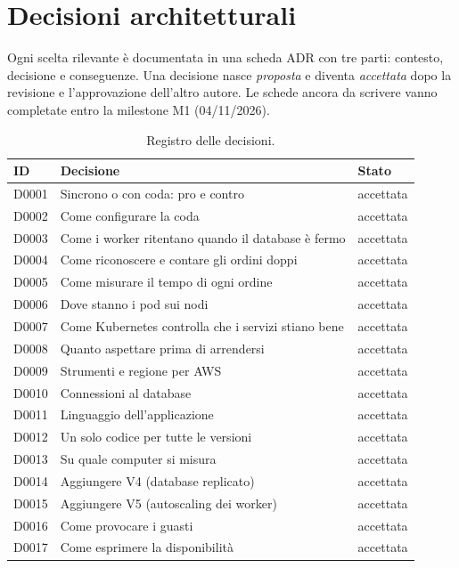 \chapter{Decisioni architetturali}
\label{cap:decisioni}

Ogni scelta rilevante è documentata in una scheda ADR con tre parti: contesto, decisione e conseguenze. Una decisione nasce \emph{proposta} e diventa \emph{accettata} dopo la revisione e l'approvazione dell'altro autore. Le schede ancora da scrivere vanno completate entro la milestone M1 (04/11/2026).

\begin{table}[htbp]
\centering
\caption{Registro delle decisioni.}
\label{tab:registro-decisioni}
\begin{tabularx}{\linewidth}{@{}lLl@{}}
\toprule
\textbf{ID} & \textbf{Decisione} & \textbf{Stato} \\
\midrule
D0001 & Sincrono o con coda: pro e contro & accettata \\
D0002 & Come configurare la coda & accettata \\
D0003 & Come i worker ritentano quando il database è fermo & accettata \\
D0004 & Come riconoscere e contare gli ordini doppi & accettata \\
D0005 & Come misurare il tempo di ogni ordine & accettata \\
D0006 & Dove stanno i pod sui nodi & accettata \\
D0007 & Come Kubernetes controlla che i servizi stiano bene & accettata \\
D0008 & Quanto aspettare prima di arrendersi & accettata \\
D0009 & Strumenti e regione per AWS & accettata \\
D0010 & Connessioni al database & accettata \\
D0011 & Linguaggio dell'applicazione & accettata \\
D0012 & Un solo codice per tutte le versioni & accettata \\
D0013 & Su quale computer si misura & accettata \\
D0014 & Aggiungere V4 (database replicato) & accettata \\
D0015 & Aggiungere V5 (autoscaling dei worker) & accettata \\
D0016 & Come provocare i guasti & accettata \\
D0017 & Come esprimere la disponibilità & accettata \\
\bottomrule
\end{tabularx}
\end{table}

